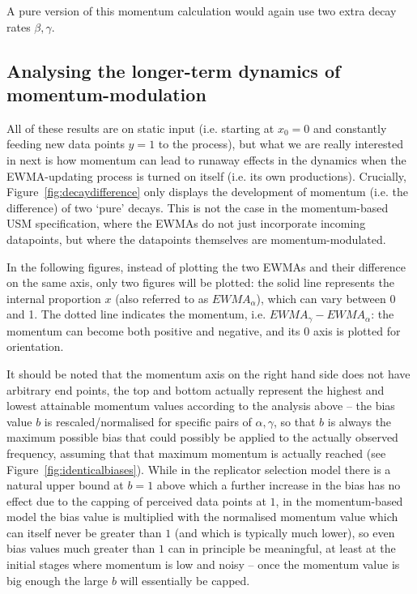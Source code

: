 A pure version of this momentum calculation would again use two extra decay rates $\beta, \gamma$.

\subsection{Analysing the longer-term dynamics of momentum-modulation}

All of these results are on static input (i.e. starting at $x_0=0$ and constantly feeding new data points $y=1$ to the process), but what we are really interested in next is how momentum can lead to runaway effects in the dynamics when the EWMA-updating process is turned on itself (i.e. its own productions). Crucially, Figure~\ref{fig:decaydifference} only displays the development of momentum (i.e. the difference) of two `pure' decays. This is not the case in the momentum-based USM specification, where the EWMAs do not just incorporate incoming datapoints, but where the datapoints themselves are momentum-modulated.

In the following figures, instead of plotting the two EWMAs and their difference on the same axis, only two figures will be plotted: the solid line represents the internal proportion $x$ (also referred to as $EWMA_\alpha$), which can vary between 0 and 1. The dotted line indicates the momentum, i.e. $EWMA_\gamma-EWMA_\alpha$: the momentum can become both positive and negative, and its 0 axis is plotted for orientation.

It should be noted that the momentum axis on the right hand side does not have arbitrary end points, the top and bottom actually represent the highest and lowest attainable momentum values according to the analysis above -- the bias value $b$ is rescaled/normalised for specific pairs of $\alpha, \gamma$, so that $b$ is always the maximum possible bias that could possibly be applied to the actually observed frequency, assuming that that maximum momentum is actually reached (see Figure~\ref{fig:identicalbiases}). While in the replicator selection model there is a natural upper bound at $b=1$ above which a further increase in the bias has no effect due to the capping of perceived data points at $1$, in the momentum-based model the bias value is multiplied with the normalised momentum value which can itself never be greater than $1$ (and which is typically much lower), so even bias values much greater than $1$ can in principle be meaningful, at least at the initial stages where momentum is low and noisy -- once the momentum value is big enough the large $b$ will essentially be capped.

